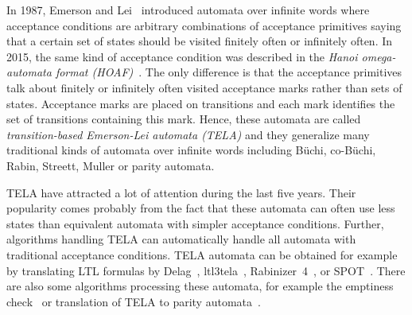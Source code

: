 \documentclass[runningheads]{llncs}
\begin{document}

In 1987, Emerson and Lei~\cite{emerson.87.scp} introduced automata
over infinite words where acceptance conditions are arbitrary
combinations of acceptance primitives saying that a certain set of
states should be visited finitely often or infinitely often. In 2015,
the same kind of acceptance condition was described in the \emph{Hanoi
  omega-automata format (HOAF)}~\cite{babiak.15.cav}. The only
difference is that the acceptance primitives talk about finitely or
infinitely often visited acceptance marks rather than sets of states.
Acceptance marks are placed on transitions and each mark identifies
the set of transitions containing this mark. Hence, these automata are
called \emph{transition-based Emerson-Lei automata (TELA)} and they
generalize many traditional kinds of automata over infinite words
including Büchi, co-Büchi, Rabin, Streett, Muller or parity
automata.

TELA have attracted a lot of attention during the last five years.
Their popularity comes probably from the fact that these automata can
often use less states than equivalent automata with simpler acceptance
conditions. Further, algorithms handling TELA can automatically handle
all automata with traditional acceptance conditions. TELA automata can
be obtained for example by translating LTL formulas by
Delag~\cite{muller.17.gandalf}, ltl3tela~\cite{major.19.atva},
Rabinizer~4~\cite{kretinsky.18.cav}, or
SPOT~\cite{duret.16.atva2}. There are also some algorithms processing
these automata, for example the emptiness check~\cite{baier.19.atva}
or translation of TELA to parity automata~\cite{renkin.20.atva}.
\end{document}
